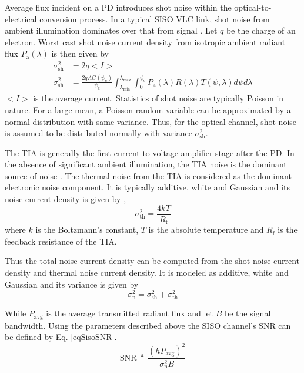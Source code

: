 Average flux incident on a PD introduces shot noise within the optical-to-electrical conversion process. In a typical SISO VLC link, shot noise from ambient illumination dominates over that from signal \cite{bar94a}. Let $q$ be the charge of an electron. Worst cast shot noise current density from isotropic ambient radiant flux $P_{\text{a}}(\lambda)$ is then given by
\begin{align}
	\sigma_{\text{sh}}^{2} &= 2q<I> \label{eqNshotGen}\\
	\sigma_{\text{sh}}^{2} &= \frac{2qAG(\psi_{\text{c}})}{\psi_{\text{c}}}\int_{\lambda_{\text{min}}}^{\lambda_{\text{max}}}\int_{0}^{\psi_{\text{c}}}P_{\text{a}}(\lambda)R(\lambda)T(\psi,\lambda)d\psi d\lambda 	  \label{eqNshot}
\end{align}
$<I>$ is the average current. Statistics of shot noise are typically Poisson in nature. For a large mean, a Poisson random variable can be approximated by a normal distribution with same variance. Thus, for the optical channel, shot noise is assumed to be distributed normally with variance $\sigma_{\text{sh}}^{2}$.

The TIA is generally the first current to voltage amplifier stage after the PD. In the absence of significant ambient illumination, the TIA noise is the dominant source of noise \cite{kah97a}. The thermal noise from the TIA is considered as the dominant electronic noise component. It is typically additive, white and Gaussian and its noise current density is given by \cite{kah97a},
\begin{equation}
	\label{eqNpa}
	\sigma_{\text{th}}^{2} = \frac{4kT}{R_{\text{f}}}
\end{equation}
where $k$ is the Boltzmann's constant, $T$ is the absolute temperature and $R_{\text{f}}$ is the feedback resistance of the TIA.

Thus the total noise current density can be computed from the shot noise current density and thermal noise current density. It is modeled as additive, white and Gaussian and its variance is given by 
\begin{equation}
	\label{eqNoise}
	\sigma_{\text{n}}^{2} = \sigma_{\text{sh}}^{2} + \sigma_{\text{th}}^{2}
\end{equation}

While $P_{\text{avg}}$ is the average transmitted radiant flux and let $B$ be the signal bandwidth. Using the parameters described above the SISO channel's SNR can be defined by Eq. \eqref{eqSisoSNR}.
\begin{equation}
	\label{eqSisoSNR}
	\text{SNR} \triangleq \frac{(hP_{\text{avg}})^{2}}{\sigma_{\text{n}}^{2}B}
\end{equation}

